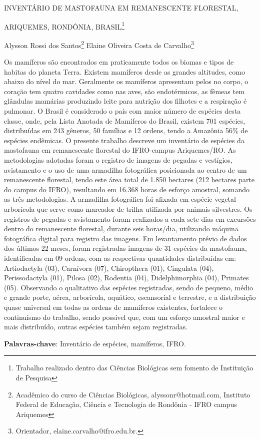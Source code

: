 \documentclass[article,12pt,onesidea,4paper,english,brazil]{abntex2}
\begin{document}
	
	
	\frenchspacing 
	
	\begin{center}
		\LARGE INVENTÁRIO DE MASTOFAUNA EM REMANESCENTE FLORESTAL,
		
		ARIQUEMES, RONDÔNIA, BRASIL\footnote{Trabalho realizado dentro das Ciências Biológicas sem fomento de Instituição de Pesquisa}
	
		\normalsize
	Alysson Rossi dos Santos\footnote{Acadêmico do curso de Ciências Biológicas, alyssonr@hotmail.com, Instituto Federal de Educação,
		Ciência e Tecnologia de Rondônia - IFRO campus Ariquemes} 
	Elaine Oliveira Costa de Carvalho\footnote{Orientador, elaine.carvalho@ifro.edu.br.}
	
	\end{center}
	
	\noindent Os mamíferos são encontrados em praticamente todos os biomas e tipos de habitas
	do planeta Terra. Existem mamíferos desde as grandes altitudes, como abaixo do
	nível do mar. Geralmente os mamíferos apresentam pelos no corpo, o coração tem
	quatro cavidades como nas aves, são endotérmicos, as fêmeas tem glândulas
	mamárias produzindo leite para nutrição dos filhotes e a respiração é pulmonar. O
	Brasil é considerado o país com maior número de espécies desta classe, onde, pela
	Lista Anotada de Mamíferos do Brasil, existem 701 espécies, distribuídas em 243
	gêneros, 50 famílias e 12 ordens, tendo a Amazônia 56\% de espécies endêmicas. O
	presente trabalho descreve um inventário de espécies da mastofauna em
	remanescente florestal do IFRO-campus Ariquemes/RO. As metodologias adotadas
	foram o registro de imagens de pegadas e vestígios, avistamento e o uso de uma
	armadilha fotográfica posicionada ao centro de um remanescente florestal, tendo
	este área total de 1.850 hectares (212 hectares parte do campus do IFRO),
	resultando em 16.368 horas de esforço amostral, somando as três metodologias. A
	armadilha fotográfica foi afixada em espécie vegetal arborícola que serve como
	marcador de trilha utilizada por animais silvestres. Os registros de pegadas e
	avistamento foram realizados a cada sete dias em excursões dentro do
	remanescente florestal, durante seis horas/dia, utilizando máquina fotográfica digital
	para registro das imagens. Em levantamento prévio de dados dos últimos 22 meses,
	foram registradas imagens de 31 espécies da mastofauna, identificadas em 09
	ordens, com as respectivas quantidades distribuídas em: Artiodactyla (03), Carnívora
	(07), Chiropthera (01), Cingulata (04), Perissodactyla (01), Pilosa (02), Rodentia (04),
	Didelphimorphia (04), Primates (05). Observando o qualitativo das espécies
	registradas, sendo de pequeno, médio e grande porte, aérea, arborícola, aquático,
	escansorial e terrestre, e a distribuição quase universal em todas as ordens de
	mamíferos existentes, fortalece o continuísmo do trabalho, sendo possível que, com
	um esforço amostral maior e mais distribuído, outras espécies também sejam
	registradas.
	
	\vspace{\onelineskip}
	
	\noindent
	\textbf{Palavras-chave}: Inventário de espécies, mamíferos, IFRO.
	
\end{document}
